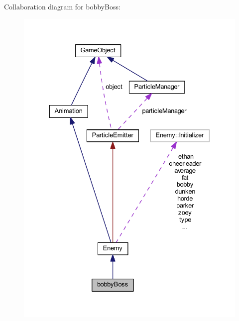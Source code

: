 Collaboration diagram for bobby\+Boss\+:\nopagebreak
\begin{figure}[H]
\begin{center}
\leavevmode
\includegraphics[width=330pt]{classbobby_boss__coll__graph}
\end{center}
\end{figure}
